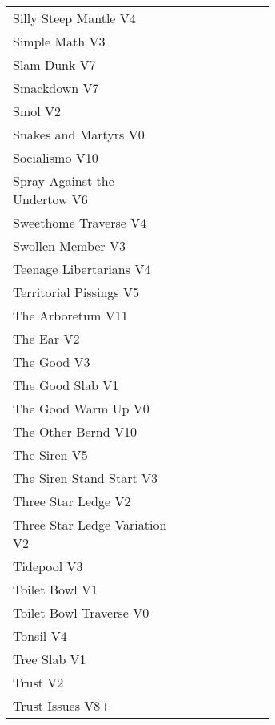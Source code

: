 \begin{flushleft}
\begin{center}
\begin{supertabular}{p{0.65\linewidth}r}
Silly Steep Mantle V4 & \pageref{rt:Silly Steep Mantle} \\
Simple Math V3 & \pageref{rt:Simple Math} \\
Slam Dunk V7 & \pageref{rt:Slam Dunk} \\
Smackdown V7 & \pageref{rt:Smackdown} \\
Smol V2 & \pageref{rt:Smol} \\
Snakes and Martyrs V0 & \pageref{rt:Snakes and Martyrs} \\
Socialismo V10 & \pageref{rt:Socialismo} \\
Spray Against the Undertow V6 & \pageref{vr:Spray Against the Undertow} \\
Sweethome Traverse V4 & \pageref{vr:Sweethome Traverse} \\
Swollen Member V3 & \pageref{rt:Swollen Member} \\
Teenage Libertarians V4 & \pageref{rt:Teenage Libertarians} \\
Territorial Pissings V5 & \pageref{rt:Territorial Pissings} \\
The Arboretum V11 & \pageref{rt:The Arboretum} \\
The Ear V2 & \pageref{rt:The Ear} \\
The Good V3 & \pageref{rt:The Good} \\
The Good Slab V1 & \pageref{rt:The Good Slab} \\
The Good Warm Up V0 & \pageref{rt:The Good Warm Up} \\
The Other Bernd V10 & \pageref{rt:The Other Bernd} \\
The Siren V5 & \pageref{rt:The Siren} \\
The Siren Stand Start V3 & \pageref{vr:The Siren Stand Start} \\
Three Star Ledge V2 & \pageref{rt:Three Star Ledge} \\
Three Star Ledge Variation V2 & \pageref{vr:Three Star Ledge Variation} \\
Tidepool V3 & \pageref{rt:Tidepool} \\
Toilet Bowl V1 & \pageref{rt:Toilet Bowl} \\
Toilet Bowl Traverse V0 & \pageref{rt:Toilet Bowl Traverse} \\
Tonsil V4 & \pageref{rt:Tonsil} \\
Tree Slab V1 & \pageref{rt:Tree Slab} \\
Trust V2 & \pageref{rt:Trust} \\
Trust Issues V8+ & \pageref{rt:Trust Issues} \\

\end{supertabular}
\end{center}
\end{flushleft}
